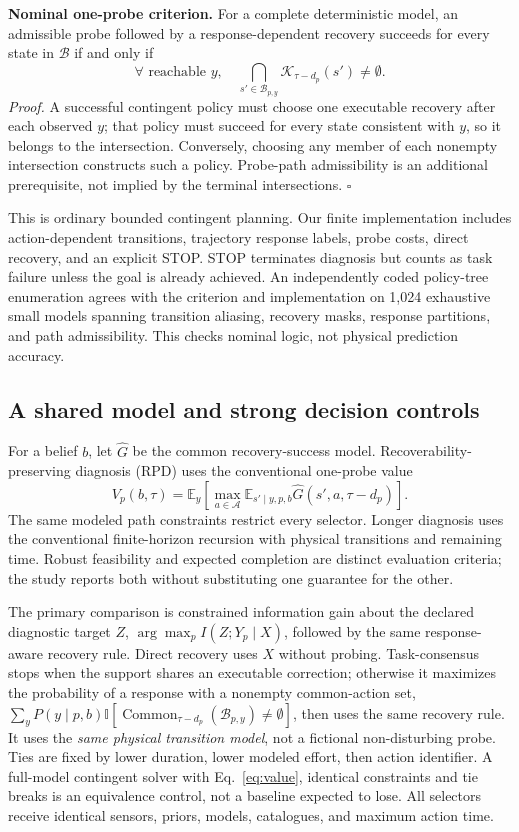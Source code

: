 \documentclass[conference]{IEEEtran}
\newcommand{\K}{\mathcal K}
\newcommand{\A}{\mathcal A}
\newcommand{\B}{\mathcal B}
\newcommand{\E}{\mathbb E}
\newcommand{\ind}{\mathbb I}
\begin{document}
\textbf{Nominal one-probe criterion.} For a complete deterministic model, an admissible probe followed by a response-dependent recovery succeeds for every state in $\B$ if and only if
\begin{equation}
\forall\text{ reachable }y,\quad
\bigcap_{s'\in\B_{p,y}}\K_{\tau-d_p}(s')\ne\emptyset.\label{eq:criterion}
\end{equation}
\emph{Proof.} A successful contingent policy must choose one executable recovery after each observed $y$; that policy must succeed for every state consistent with $y$, so it belongs to the intersection. Conversely, choosing any member of each nonempty intersection constructs such a policy. Probe-path admissibility is an additional prerequisite, not implied by the terminal intersections. $\square$

This is ordinary bounded contingent planning. Our finite implementation includes action-dependent transitions, trajectory response labels, probe costs, direct recovery, and an explicit STOP. STOP terminates diagnosis but counts as task failure unless the goal is already achieved. An independently coded policy-tree enumeration agrees with the criterion and implementation on 1,024 exhaustive small models spanning transition aliasing, recovery masks, response partitions, and path admissibility. This checks nominal logic, not physical prediction accuracy.

\subsection{A shared model and strong decision controls}
For a belief $b$, let $\widehat G$ be the common recovery-success model. Recoverability-preserving diagnosis (RPD) uses the conventional one-probe value
\begin{equation}
V_p(b,\tau)=\E_y\!\left[\max_{a\in\A}\E_{s'\mid y,p,b}\widehat G(s',a,\tau-d_p)\right].\label{eq:value}
\end{equation}
The same modeled path constraints restrict every selector. Longer diagnosis uses the conventional finite-horizon recursion with physical transitions and remaining time. Robust feasibility and expected completion are distinct evaluation criteria; the study reports both without substituting one guarantee for the other.

The primary comparison is constrained information gain about the declared diagnostic target $Z$, $\arg\max_p I(Z;Y_p\mid X)$, followed by the same response-aware recovery rule. Direct recovery uses $X$ without probing. Task-consensus stops when the support shares an executable correction; otherwise it maximizes the probability of a response with a nonempty common-action set, $\sum_y P(y\mid p,b)\ind[\operatorname{Common}_{\tau-d_p}(\B_{p,y})\ne\emptyset]$, then uses the same recovery rule. It uses the \emph{same physical transition model}, not a fictional non-disturbing probe. Ties are fixed by lower duration, lower modeled effort, then action identifier. A full-model contingent solver with Eq.~\eqref{eq:value}, identical constraints and tie breaks is an equivalence control, not a baseline expected to lose. All selectors receive identical sensors, priors, models, catalogues, and maximum action time.
\end{document}
